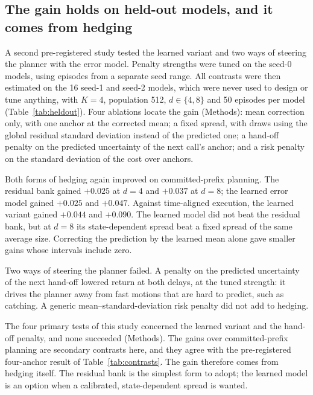 \documentclass[aps,physrev,\manuscriptlayout,superscriptaddress,
  longbibliography,amsmath,amssymb]{revtex4-2}
\begin{document}
\subsection{The gain holds on held-out models, and it comes from hedging}\label{sec:heldout}

A second pre-registered study tested the learned variant and two ways of steering the planner with the error model. Penalty strengths were tuned on the seed-0 models, using episodes from a separate seed range. All contrasts were then estimated on the 16 seed-1 and seed-2 models, which were never used to design or tune anything, with $K=4$, population 512, $d\in\{4,8\}$ and 50 episodes per model (Table~\ref{tab:heldout}). Four ablations locate the gain (Methods): mean correction only, with one anchor at the corrected mean; a fixed spread, with draws using the global residual standard deviation instead of the predicted one; a hand-off penalty on the predicted uncertainty of the next call's anchor; and a risk penalty on the standard deviation of the cost over anchors.

Both forms of hedging again improved on committed-prefix planning. The residual bank gained $+0.025$ at $d=4$ and $+0.037$ at $d=8$; the learned error model gained $+0.025$ and $+0.047$. Against time-aligned execution, the learned variant gained $+0.044$ and $+0.090$. The learned model did not beat the residual bank, but at $d=8$ its state-dependent spread beat a fixed spread of the same average size. Correcting the prediction by the learned mean alone gave smaller gains whose intervals include zero.

Two ways of steering the planner failed. A penalty on the predicted uncertainty of the next hand-off lowered return at both delays, at the tuned strength: it drives the planner away from fast motions that are hard to predict, such as catching. A generic mean--standard-deviation risk penalty did not add to hedging.

The four primary tests of this study concerned the learned variant and the hand-off penalty, and none succeeded (Methods). The gains over committed-prefix planning are secondary contrasts here, and they agree with the pre-registered four-anchor result of Table~\ref{tab:contrasts}. The gain therefore comes from hedging itself. The residual bank is the simplest form to adopt; the learned model is an option when a calibrated, state-dependent spread is wanted.
\end{document}
